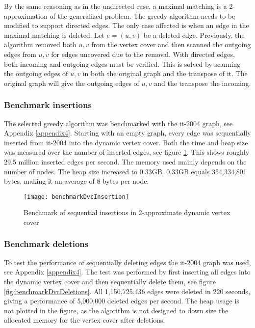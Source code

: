 By the same reasoning as in the undirected case, a maximal matching is a $2$-approximation of the generalized problem. The greedy algorithm needs to be modified to support directed edges. The only case affected is when an edge in the maximal matching is deleted. Let $e = (u,v)$ be a deleted edge. Previously, the algorithm removed both $u,v$ from the vertex cover and then scanned the outgoing edges from $u,v$ for edges uncovered due to the removal. With directed edges, both incoming and outgoing edges must be verified. This is solved by scanning the outgoing edges of $u,v$ in both the original graph and the transpose of it. The original graph will give the outgoing edges of $u,v$ and the transpose the incoming.

\subsubsection{Benchmark insertions}
The selected greedy algorithm was benchmarked with the it-2004 graph, see Appendix \ref{appendix4}. Starting with an empty graph, every edge was sequentially inserted from it-2004 into the dynamic vertex cover. Both the time and heap size was measured over the number of inserted edges, see figure \ref{fig:benchmarkDvcInsertion}. This shows roughly 29.5 million inserted edges per second. The memory used mainly depends on the number of nodes. The heap size increased to 0.33GB. 0.33GB equals 354,334,801 bytes, making it an average of 8 bytes per node. 

\begin{figure}[h]
\centering
\texttt{[image: benchmarkDvcInsertion]}    
\captionsetup{justification=centering}
\caption {Benchmark of sequential insertions in 2-approximate dynamic vertex cover}
\label{fig:benchmarkDvcInsertion}
\end{figure}

\subsubsection{Benchmark deletions}
To test the performance of sequentially deleting edges the it-2004 graph was used, see Appendix \ref{appendix4}. The test was performed by first inserting all edges into the dynamic vertex cover and then sequentially delete them, see figure \ref{fig:benchmarkDvcDeletions}. All 1,150,725,436 edges were deleted in 220 seconds, giving a performance of 5,000,000 deleted edges per second. The heap usage is not plotted in the figure, as the algorithm is not designed to down size the allocated memory for the vertex cover after deletions. 

